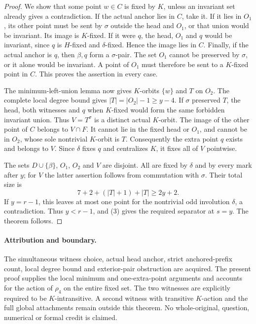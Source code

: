 \documentclass[11pt,a4paper]{article}
\begin{document}
\begin{proof}
We show that some point $w\in C$ is fixed
by $K$, unless an invariant set already
gives a contradiction. If the actual anchor
lies in $C$, take it. If it lies in $O_1$,
its other point must be sent by $\sigma$
outside the head and $O_1$, or that union
would be invariant. Its image is $K$-fixed.
If it were $q$, the head, $O_1$ and $q$
would be invariant, since $q$ is $H$-fixed
and $\delta$-fixed. Hence the image lies
in $C$. Finally, if the actual anchor is
$q$, then $\beta,q$ form a $\sigma$-pair.
The set $O_1$ cannot be preserved by
$\sigma$, or it alone would be invariant.
A point of $O_1$ must therefore be sent
to a $K$-fixed point in $C$. This proves
the assertion in every case.

The minimum-left-union lemma now gives
$K$-orbits $\{w\}$ and $T$ on $O_2$.
The complete local degree bound gives
$|T|=|O_2|-1\ge y-4$. If $\sigma$ preserved
$T$, the head, both witnesses and $q$
when $K$-fixed would form the same forbidden
invariant union. Thus $V=T^\sigma$ is a
distinct actual $K$-orbit. The image of the
other point of $C$ belongs to $V\cap F$.
It cannot lie in the fixed head or $O_1$,
and cannot be in $O_2$, whose sole nontrivial
$K$-orbit is $T$. Consequently the extra
point $q$ exists and belongs to $V$.
Since $\delta$ fixes $q$ and centralizes
$K$, it fixes all of $V$ pointwise.

The sets $D\cup\{\beta\}$, $O_1$, $O_2$
and $V$ are disjoint. All are fixed by
$\delta$ and by every mark after $y$;
for $V$ the latter assertion follows from
commutation with $\sigma$. Their total
size is
\[
                    7+2+(|T|+1)+|T|
                        \ge2y+2.                 \tag{3}
\]
If $y=r-1$, this leaves at most one point
for the nontrivial odd involution $\delta$,
a contradiction. Thus $y<r-1$, and (3)
gives the required separator at $s=y$.
The theorem follows.
\end{proof}

\paragraph{Attribution and boundary.}
The simultaneous witness choice, actual head
anchor, strict anchored-prefix count, local
degree bound and exterior-pair obstruction
are acquired. The present proof supplies
the local minimum and one-extra-point
arguments and accounts for the action of
$\rho_4$ on the entire fixed set. The two
witnesses are explicitly required to be
$K$-intransitive. A second witness with
transitive $K$-action and the full global
attachments remain outside this theorem.
No whole-original, question, numerical or
formal credit is claimed.
\end{document}
